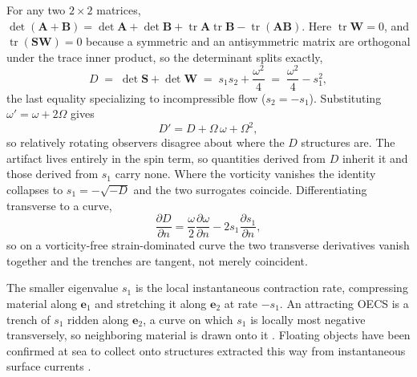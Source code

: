 \documentclass[lettersize,journal]{IEEEtran}
\begin{document}
For any two $2 \times 2$ matrices,
$\det(\mathbf{A}+\mathbf{B}) = \det\mathbf{A} + \det\mathbf{B} +
\operatorname{tr}\mathbf{A}\operatorname{tr}\mathbf{B} -
\operatorname{tr}(\mathbf{A}\mathbf{B})$. Here $\operatorname{tr}
\mathbf{W} = 0$, and $\operatorname{tr}(\mathbf{S}\mathbf{W}) = 0$
because a symmetric and an antisymmetric matrix are orthogonal under
the trace inner product, so the determinant splits exactly,
\begin{equation}
    D \;=\; \det\mathbf{S} + \det\mathbf{W}
      \;=\; s_1 s_2 + \frac{\omega^2}{4}
      \;=\; \frac{\omega^2}{4} - s_1^2,
    \label{eq:splitting}
\end{equation}
the last equality specializing to incompressible flow ($s_2 = -s_1$).
Substituting $\omega' = \omega + 2\Omega$ gives
\begin{equation}
    D' = D + \Omega\,\omega + \Omega^2 ,
    \label{eq:D_not_objective}
\end{equation}
so relatively rotating observers disagree about where the $D$ structures
are. The artifact lives entirely in the spin term,
so quantities derived from $D$ inherit it and those
derived from $s_1$ carry none. Where the vorticity vanishes the
identity collapses to $s_1 = -\sqrt{-D}$ and the two surrogates
coincide. Differentiating transverse to a curve,
\begin{equation}
    \frac{\partial D}{\partial n} =
    \frac{\omega}{2}\frac{\partial \omega}{\partial n}
    - 2 s_1 \frac{\partial s_1}{\partial n},
    \label{eq:trench_coincide}
\end{equation}
so on a vorticity-free strain-dominated curve the two transverse
derivatives vanish together and the trenches are tangent, not merely
coincident.

The smaller eigenvalue $s_1$ is the local instantaneous contraction
rate, compressing material along $\mathbf{e}_1$ and stretching it along
$\mathbf{e}_2$ at rate $-s_1$. An attracting OECS is a trench of $s_1$
ridden along $\mathbf{e}_2$, a curve on which $s_1$ is locally most
negative transversely, so neighboring material is drawn onto it
\cite{17}. Floating objects have been confirmed at sea to collect onto
structures extracted this way from instantaneous surface currents
\cite{12}.
\end{document}
